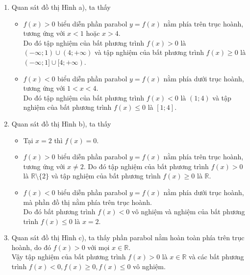 \begin{bt}
{		\begin{enumerate}
			\item Quan sát đồ thị Hình a), ta thấy
			\begin{itemize}
				\item $f(x)>0$ biểu diễn phần parabol $y=f(x)$ nằm phía trên trục hoành, tương ứng với $x<1$ hoặc $x>4$.\\
				Do đó tập nghiệm của bất phương trình $f(x)>0$ là $(-\infty; 1) \cup (4;+\infty)$ và tập nghiệm của bất phương trình $f(x) \geq 0$ là $(-\infty; 1] \cup [4;+\infty)$.
				\item $f(x)<0$ biểu diễn phần parabol $y=f(x)$ nằm phía dưới trục hoành, tương ứng với $1<x<4$.\\
				Do đó tập nghiệm của bất phương trình $f(x)<0$ là $(1; 4)$
				và tập nghiệm của bất phương trình $f(x) \leq 0$ là $[1; 4]$.
			\end{itemize}
			\item Quan sát đồ thị Hình b), ta thấy
			\begin{itemize}
				\item Tại $x=2$ thì $f(x)=0$.
				\item $f(x)>0$ biểu diễn phần parabol $y=f(x)$ nằm phía trên trục hoành, tương ứng với $x \neq 2$.
				Do đó tập nghiệm của bất phương trình $f(x)>0$ là $\mathbb{R} \setminus \{2\}$ và tập nghiệm của bất phương trình $f(x) \geq 0$ là $\mathbb{R}$.
				\item $f(x)<0$ biểu diễn phần parabol $y=f(x)$ nằm phía dưới trục hoành, mà phần đồ thị nằm phía trên trục hoành.\\
				Do đó bất phương trình $f(x)<0$ vô nghiệm và nghiệm của bất phương trình $f(x) \leq 0$ là $x=2$.
			\end{itemize}
			\item Quan sát đồ thị Hình c), ta thấy phần parabol nằm hoàn toàn phía trên trục hoành, do đó $f(x)>0$ với mọi $x \in \mathbb{R}$.\\
			Vậy tập nghiệm của bất phương trình $f(x)>0$ là $x \in \mathbb{R}$ và các bất phương trình $f(x)<0, f(x) \geq 0, f(x) \leq 0$ vô nghiệm.
		\end{enumerate}
	}
\end{bt}

